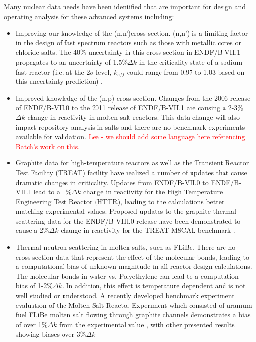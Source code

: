 \documentclass[letterpaper,draft]{ar-1col}
\newcommand{\textred}[1]{\textcolor{red}{ #1}}
\begin{document}
Many nuclear data needs have been identified that are important for design and operating analysis for these advanced systems including:
\begin{itemize}
  \item Improving our knowledge of the (n,n')cross section.   (n,n') is a limiting factor in the design of fast spectrum reactors such as those with metallic cores or chloride salts. The 40\% uncertainty in this cross section in ENDF/B-VII.1 propagates to an uncertainty of 1.5\%$\Delta k$ in the criticality state of a sodium fast reactor (i.e. at the 2$\sigma$ level, $k_{eff}$ could range from 0.97 to 1.03 based on this uncertainty prediction) \cite{touran2016sensitivities}.
  \item Improved knowledge of the (n,p) cross section.  Changes from the 2006 release of ENDF/B-VII.0 to the 2011 release of ENDF/B-VII.1 are causing a 2-3\%$\Delta k$ change in reactivity in molten salt reactors. This data change will also impact repository analysis in salts and there are no benchmark experiments available for validation. \textred{Lee - we should add some language here referencing Batch's work on this.}
  \item Graphite data for high-temperature reactors as well as the Transient Reactor Test Facility (TREAT) facility have realized a number of updates that cause dramatic changes in criticality. Updates from ENDF/B-VII.0 to ENDF/B-VII.1 lead to a 1\%$\Delta k$ change in reactivity for the High Temperature Engineering Test Reactor (HTTR), leading to the calculations better matching experimental values. Proposed updates to the graphite thermal scattering data for the ENDF/B-VIII.0 release have been demonstrated to cause a 2\%$\Delta k$ change in reactivity for the TREAT M8CAL benchmark \cite{hawarithermal}.
  \item Thermal neutron scattering in molten salts, such as FLiBe. There are no cross-section data that represent the effect of the molecular bonds, leading to a computational bias of unknown magnitude in all reactor design calculations. The molecular bonds in water vs. Polyethylene can lead to a computation bias of 1-2\%$\Delta k$.  In addition, this effect is temperature dependent and is not well studied or understood. A recently developed benchmark experiment evaluation of the Molten Salt Reactor Experiment which consisted of uranium fuel FLiBe molten salt flowing through graphite channels demonstrates a bias of over 1\%$\Delta k$ from the experimental value \cite{shenzero}, with other presented results showing biases over 3\%$\Delta k$

\end{itemize}
\end{document}
